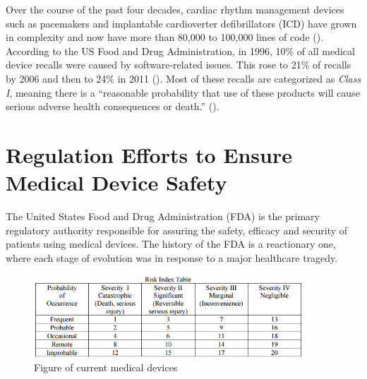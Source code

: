   Over the course of the past four decades, cardiac rhythm management devices such as pacemakers and implantable cardioverter defibrillators (ICD) have grown in complexity and now have more than 80,000 to 100,000 lines of code (\cite{pauljones}). According to the US Food and Drug Administration, in 1996, 10\% of all medical device recalls were caused by software-related issues. This rose to 21\% of recalls by 2006 and then to 24\% in 2011 (\cite{medstats}). Most of these recalls are categorized as \emph{Class I}, meaning there is a ``reasonable probability that use of these products will cause serious adverse health consequences or death.'' (\cite{medstats2,pacemakerrecalls,killedbycode}). 
	
\section{Regulation Efforts to Ensure Medical Device Safety}
The United States Food and Drug Administration (FDA) is the primary regulatory authority responsible for assuring the safety, efficacy and security of patients using medical devices. The history of the FDA is a reactionary one, where each stage of evolution was in response to a major healthcare tragedy. 
\begin{figure}[t]
		\centering
		\includegraphics[width=0.9\textwidth]{figs/risk.jpg}
		\caption{\small Figure of current medical devices}
		\label{fig:Cur}
\end{figure}
